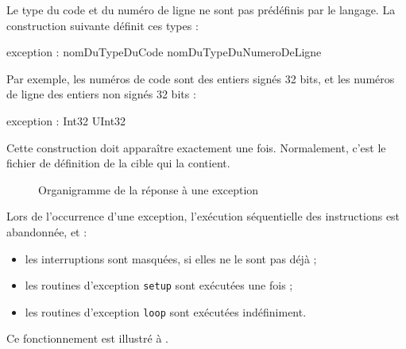 Le type du code et du numéro de ligne ne sont pas prédéfinis par le langage. La construction suivante définit ces types :
\begin{PLM}
exception : nomDuTypeDuCode nomDuTypeDuNumeroDeLigne
\end{PLM}

Par exemple, les numéros de code sont des entiers signés 32 bits, et les numéros de ligne des entiers non signés 32 bits :
\begin{PLM}
exception : Int32 UInt32
\end{PLM}

Cette construction doit apparaître exactement une fois. Normalement, c'est le fichier de définition de la cible qui la contient.



\begin{figure}[t]
  \centering
  \small
  \caption{Organigramme de la réponse à une exception}
  \ligne
\end{figure}

Lors de l'occurrence d'une exception, l'exécution séquentielle des instructions est abandonnée, et :
\begin{itemize}
  \item les interruptions sont masquées, si elles ne le sont pas déjà ;
  \item les routines d'exception \texttt{setup} sont exécutées une fois ;
  \item les routines d'exception \texttt{loop} sont exécutées indéfiniment.
\end{itemize}
Ce fonctionnement est illustré à .

